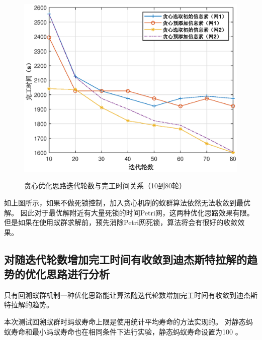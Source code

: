 \begin{figure}[H]
	\centering
	\includegraphics[scale=1.00,angle=0]{figures/test2.eps}\\
	\caption{贪心优化思路迭代轮数与完工时间关系（10到80轮）}
\end{figure}

如上图所示，如果不做死锁控制，加入贪心机制的蚁群算法依然无法收敛到最优解。
因此对于最优解附近有大量死锁的时间Petri网，这两种优化思路效果有限。但是如果在使用蚁群求解前，预先消除Petri网死锁，算法将会有很好的收敛效果。

\subsection{对随迭代轮数增加完工时间有收敛到迪杰斯特拉解的趋势的优化思路进行分析}
只有回溯蚁群机制一种优化思路能让算法随迭代轮数增加完工时间有收敛到迪杰斯特拉解的趋势。

本次测试回溯蚁群时蚂蚁寿命上限是使用统计平均寿命的方法实现的。
对静态蚂蚁寿命和最小蚂蚁寿命也在相同条件下进行实验，静态蚂蚁寿命设置为100 。

\begin{table}[H]
	\centering
	\caption{各寿命上限机制与完工时间与迭代轮数关系}
\end{table}

